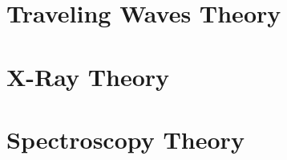 \documentclass[12pt, a4paper, oneside, openright, titlepage]{book}
\begin{document}
\begin{subappendices}

    \section{Traveling Waves Theory}


    \section{X-Ray Theory}

    \section{Spectroscopy Theory}


\end{subappendices}
\end{document}
